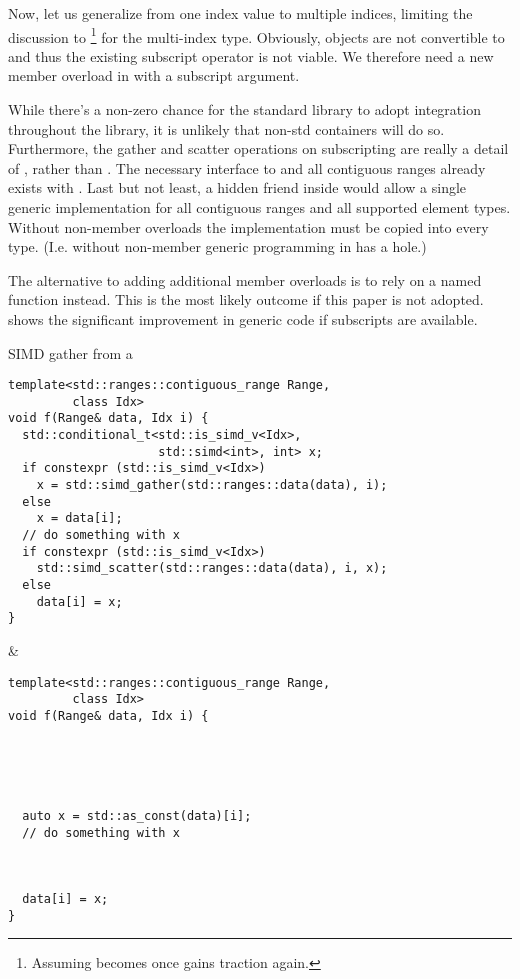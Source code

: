 Now, let us generalize  from one index value to multiple indices,
limiting the discussion to \footnote{Assuming
 becomes  once \cite{P1928R0}
gains traction again.} for the multi-index type. Obviously, 
objects are not convertible to  and thus the existing subscript
operator is not viable. We therefore need a new member 
overload in  with a  subscript argument.

While there's a non-zero chance for the standard library to adopt 
integration throughout the library, it is unlikely that non-std containers will
do so. Furthermore, the gather and scatter operations on subscripting are
really a detail of , rather than . The necessary
interface to  and all contiguous ranges already exists with
. Last but not least, a hidden friend 
inside  would allow a single generic implementation for all
contiguous ranges and all supported  element types. Without
non-member overloads the implementation must be copied into every type. (I.e.
without non-member  generic programming in \CC{} has a hole.)

The alternative to adding additional member  overloads
is to rely on a named function instead. This is the most likely outcome if this
paper is not adopted.  shows the significant improvement in
generic code if  subscripts are available.
\begin{tonytable}{SIMD gather from a }\label{tt:gather}
\smaller\begin{lstlisting}
template<std::ranges::contiguous_range Range,
         class Idx>
void f(Range& data, Idx i) {
  std::conditional_t<std::is_simd_v<Idx>,
                     std::simd<int>, int> x;
  if constexpr (std::is_simd_v<Idx>)
    x = std::simd_gather(std::ranges::data(data), i);
  else
    x = data[i];
  // do something with x
  if constexpr (std::is_simd_v<Idx>)
    std::simd_scatter(std::ranges::data(data), i, x);
  else
    data[i] = x;
}
\end{lstlisting}
&
\smaller\begin{lstlisting}
template<std::ranges::contiguous_range Range,
         class Idx>
void f(Range& data, Idx i) {





  auto x = std::as_const(data)[i];
  // do something with x



  data[i] = x;
}
\end{lstlisting}
\end{tonytable}%

